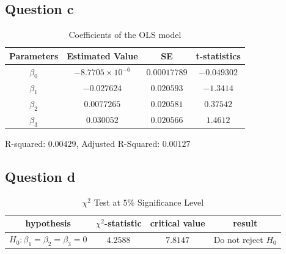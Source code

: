 \documentclass{report}
\begin{document}
\subsection*{Question c}

 \begin{table}[H]
	\begin{center}
		\caption{Coefficients of the OLS model}
		\label{tab:table5}
		\vspace{2mm}
		\begin{tabular}{c|c|c|c|} 
			
			
			\textbf{Parameters} & \textbf{Estimated Value}&  \textbf{SE}& \textbf{t-statistics}\\
			\hline
			
			$\beta_0$ &  $-8.7705\times 10^{-6}$& $0.00017789$&$-0.049302$    \\
			$\beta_1$ &  $-0.027624$& $0.020593$&$-1.3414$    \\
			$\beta_2$ &  $0.0077265$& $0.020581$&$0.37542$    \\
			$\beta_3$ &  $0.030052$& $0.020566$&$1.4612$    \\
		\end{tabular}
	\end{center}
\end{table}
R-squared: $0.00429$,  Adjusted R-Squared: $0.00127$

\subsection*{Question d}


\begin{table}[H]
	\begin{center}
		\caption{$\chi^2$ Test at $5\%$ Significance Level}
		\label{tab:table6}
		\vspace{2mm}
		\begin{tabular}{c|c|c|c|} 
			
			
			\textbf{hypothesis} & \textbf{$\chi^2$-statistic}&  \textbf{critical value}& \textbf{result}\\
			\hline
			$H_0:\beta_1=\beta_2=\beta_3=0$ &$4.2588$ & $7.8147$& Do not reject $H_0$   \\
		\end{tabular}
	\end{center}
\end{table}
\end{document}
